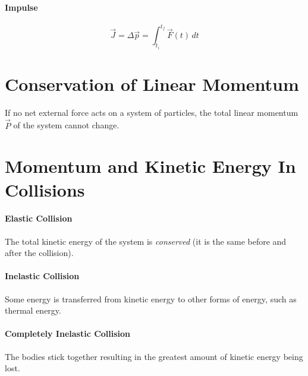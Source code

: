 \documentclass{article}
\begin{document}
        \paragraph{Impulse}
        \begin{equation}
            \vec{J} = \Delta \vec{p} = \int_{t_i}^{t_f} \vec{F}(t) \, dt
        \end{equation}

    \section{Conservation of Linear Momentum}

        If no net external force acts on a system of particles, the total linear momentum $\vec{P}$ of the system cannot change.

    \section{Momentum and Kinetic Energy In Collisions}

        \paragraph{Elastic Collision}
        The total kinetic energy of the system is \textit{conserved} (it is the same before and after the collision).

        \paragraph{Inelastic Collision}
        Some energy is transferred from kinetic energy to other forms of energy, such as thermal energy.

        \paragraph{Completely Inelastic Collision}
        The bodies stick together resulting in the greatest amount of kinetic energy being lost.
\end{document}
